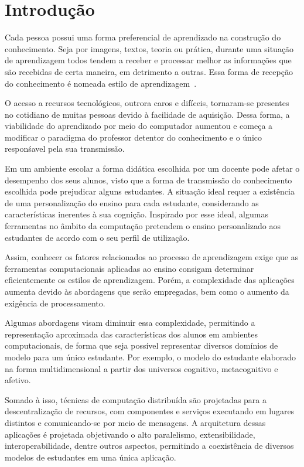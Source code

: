 \chapter{Introdução}

Cada pessoa possui uma forma preferencial de aprendizado na construção do conhecimento. Seja por imagens, textos, teoria ou prática, durante uma situação de aprendizagem todos tendem a receber e processar melhor as informações que são recebidas de certa maneira, em detrimento a outras. Essa forma de recepção do conhecimento é nomeada estilo de aprendizagem~\cite{felder1988learning}.
 
O acesso a recursos tecnológicos, outrora caros e difíceis, tornaram-se presentes no cotidiano de muitas pessoas devido à facilidade de aquisição. Dessa forma, a viabilidade do aprendizado por meio do computador aumentou e começa a modificar o paradigma do professor detentor do conhecimento e o único responśavel pela sua transmissão.

Em um ambiente escolar a forma didática escolhida por um docente pode afetar o desempenho dos seus alunos, visto que a forma de transmissão do conhecimento escolhida pode prejudicar alguns estudantes. A situação ideal requer a existência de uma personalização do ensino para cada estudante, considerando as características inerentes à sua cognição. Inspirado por esse ideal, algumas ferramentas no âmbito da computação pretendem o ensino personalizado aos estudantes de acordo com o seu perfil de utilização.

Assim, conhecer os fatores relacionados ao processo de aprendizagem exige que as ferramentas computacionais aplicadas ao ensino consigam determinar eficientemente os estilos de aprendizagem. Porém, a complexidade das aplicações aumenta devido às abordagens que serão empregadas, bem como o aumento da exigência de processamento.

Algumas abordagens visam diminuir essa complexidade, permitindo a representação aproximada das características dos alunos em ambientes computacionais, de forma que seja possível representar diversos domínios de modelo para um único estudante. Por exemplo, o modelo do estudante elaborado na forma multidimensional a partir dos universos cognitivo, metacognitivo e afetivo.

Somado à isso, técnicas de computação distribuída são projetadas para a descentralização de recursos, com componentes e serviços executando em lugares distintos e comunicando-se por meio de mensagens. A arquitetura dessas aplicações é projetada objetivando o alto paralelismo, extensibilidade, interoperabilidade, dentre outros aspectos, permitindo a coexistência de diversos modelos de estudantes em uma única aplicação.

